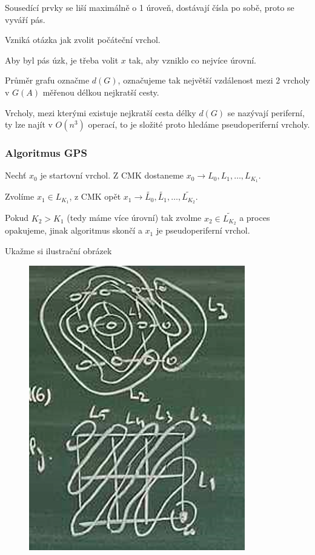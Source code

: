 \documentclass[../main.tex]{subfiles}
\begin{document}
Sousedící prvky se liší maximálně o 1 úroveň, dostávají čísla po sobě, proto se vyváří pás.

Vzniká otázka jak zvolit počáteční vrchol.

Aby byl pás úzk, je třeba volit $x$ tak, aby vzniklo co nejvíce úrovní.

Průměr grafu označme $d(G)$, označujeme tak největší vzdálenost mezi 2 vrcholy v $G(A)$ měřenou délkou nejkratší cesty.

Vrcholy, mezi kterými existuje nejkratší cesta délky $d(G)$ se nazývají periferní, ty lze najít v $O(n^3)$ operací, to je složité proto hledáme pseudoperiferní vrcholy.

\subsubsection{Algoritmus GPS}

Nechť $x_0$ je startovní vrchol. Z CMK dostaneme $x_0 \rightarrow L_0,L_1, \dots, L_{K_1}$.

Zvolíme $x_1\in L_{K_1}$, z CMK opět $x_1 \rightarrow \tilde{L_0}, \tilde{L_1}, \dots, \tilde{L_{K_2}}$.

Pokud $K_2>K_1$ (tedy máme více úrovní) tak zvolme $x_2\in \tilde{L_{K_2}}$ a proces opakujeme, jinak algoritmus skončí a $x_1$ je pseudoperiferní vrchol.

Ukažme si ilustrační obrázek

\begin{example}
    \begin{figure}[H]
        \centering
        \includegraphics{images/26-10-GPS.png}
    \end{figure}
\end{example}
\end{document}
